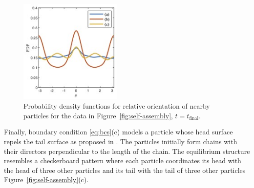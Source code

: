\begin{figure}
  \vspace{-4pt}
  \centering
  \includegraphics[width=2in]{figures/SpecificAim1/OrderPDFs.jpg} 
  \vspace{-20pt}
  \caption{\footnotesize
    \label{fig:OrderPDFs}
    Probability density functions for
    relative orientation of nearby particles
    for the data in 
    Figure~\ref{fig:self-assembly}, $t = t_{\text{final}}$.
  }
\end{figure}
Finally, boundary condition \eqref{eq:bcs}(c) models 
a particle whose head surface repels the tail surface as proposed in
\cite{MaRa76, Ma77}.
The particles initially form chains with their directors perpendicular to the
length of the chain. The equilibrium structure
resembles a checkerboard pattern
where each particle coordinates
its head with the head of three other particles and its tail with the
tail of three other particles Figure~\ref{fig:self-assembly}(c).



